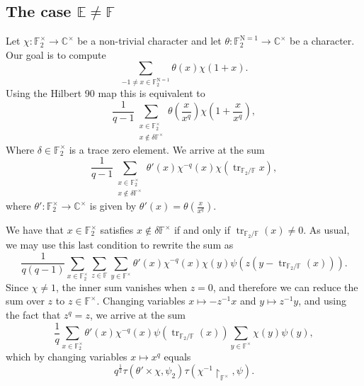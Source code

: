 \documentclass[12pt, reqno]{amsart}
\theoremstyle{definition}
\theoremstyle{definition}
\theoremstyle{definition}
\newcommand{\cComplex}{\mathbb{C}}
\newcommand{\multiplicativegroup}[1]{#1^{\times}}
\newcommand{\fieldCharacter}{\psi}
\newcommand{\trace}{\operatorname{tr}}
\newcommand{\aFieldNorm}{\mathrm{N}}
\newcommand{\finiteField}{\mathbb{F}}
\newcommand{\quadraticExtension}{\mathbb{E}}
\newcommand{\finiteFieldExtension}[1]{\finiteField_{#1}}
\newcommand{\NormOneGroup}[1]{\finiteFieldExtension{#1}^{\aFieldNorm = 1}}
\newcommand{\GaussSumCharacter}[3]{\tau\left(#1 \times #2, #3\right)}
\begin{document}
\subsection{The case $\quadraticExtension \ne \finiteField$}
Let $\chi \colon \multiplicativegroup{\finiteFieldExtension{2}} \to \multiplicativegroup{\cComplex}$ be a non-trivial character and let $\theta \colon \NormOneGroup{2} \to \multiplicativegroup{\cComplex}$ be a character. Our goal is to compute $$\sum_{-1 \ne x \in \NormOneGroup{2}} \theta\left(x\right) \chi\left(1+x\right).$$
Using the Hilbert 90 map this is equivalent to
$$\frac{1}{q-1} \sum_{\substack{x \in \multiplicativegroup{\finiteFieldExtension{2}}\\
x \notin \delta \multiplicativegroup{\finiteField}}} \theta\left(\frac{x}{x^q}\right) \chi\left(1+\frac{x}{x^q}\right),$$
Where $\delta \in \multiplicativegroup{\finiteFieldExtension{2}}$ is a trace zero element. 
We arrive at the sum
$$\frac{1}{q-1} \sum_{\substack{x \in \multiplicativegroup{\finiteFieldExtension{2}}\\
		x \notin \delta \multiplicativegroup{\finiteField}}} \theta'\left(x\right) \chi^{-q}\left(x\right) \chi\left(\trace_{\finiteFieldExtension{2} \slash \finiteField} x\right),$$
	where $\theta' \colon \multiplicativegroup{\finiteFieldExtension{2}} \to \multiplicativegroup{\cComplex}$ is given by $\theta'\left(x\right) = \theta\left(\frac{x}{x^q}\right)$.
	
	We have that $x \in \multiplicativegroup{\finiteFieldExtension{2}}$ satisfies $x \notin \delta \multiplicativegroup{\finiteField}$ if and only if $\trace_{\finiteFieldExtension{2} \slash \finiteField}\left(x\right) \ne 0$. As usual, we may use this last condition to rewrite the sum as
	$$\frac{1}{q\left(q-1\right)} \sum_{x \in \multiplicativegroup{\finiteFieldExtension{2}}}\sum_{z \in \finiteField} \sum_{y \in \multiplicativegroup{\finiteField}}  \theta'\left(x\right) \chi^{-q}\left(x\right) \chi\left(y\right) \fieldCharacter\left(z\left(y - \trace_{\finiteFieldExtension{2} \slash \finiteField} \left(x\right)\right)\right).$$
	Since $\chi \ne 1$, the inner sum vanishes when $z = 0$, and therefore we can reduce the sum over $z$ to $z \in \multiplicativegroup{\finiteField}$. Changing variables $x \mapsto -z^{-1} x$ and $y \mapsto z^{-1} y$, and using the fact that $z^q = z$, we arrive at the sum
	$$\frac{1}{q} \sum_{x \in \multiplicativegroup{\finiteFieldExtension{2}}}\theta'\left(x\right)  \chi^{-q}\left(x\right) \fieldCharacter\left(\trace_{\finiteFieldExtension{2} \slash \finiteField} \left(x\right)\right) \sum_{y \in \multiplicativegroup{\finiteField}}   \chi\left(y\right) \fieldCharacter\left(y\right),$$
	which by changing variables $x \mapsto x^q$ equals
	$$q^{\frac{1}{2}} \GaussSumCharacter{\theta'}{\chi}{\fieldCharacter_{2}} \tau\left(\chi^{-1} \restriction_{\multiplicativegroup{\finiteField}}, \fieldCharacter\right).$$
\end{document}
